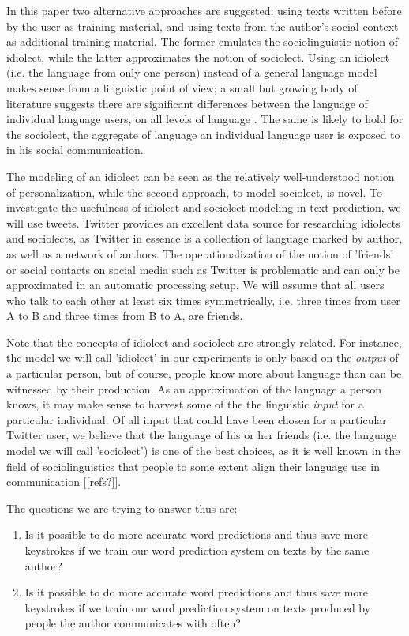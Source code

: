 \documentclass[11pt]{article}
\begin{document}
In this paper two alternative approaches are suggested: using texts written before by the user as training material, and using texts from the author's social context as additional training material. The former emulates the sociolinguistic notion of idiolect, while the latter approximates the notion of sociolect. Using an idiolect (i.e. the language from only one person) instead of a general language model makes sense from a linguistic point of view; a small but growing body of literature suggests there are significant differences between the language of individual language users, on all levels of language \cite[among others]{mollin09,barlow10}. The same is likely to hold for the sociolect, the aggregate of language an individual language user is exposed to in his social communication.

The modeling of an idiolect can be seen as the relatively well-understood notion of personalization, while the second approach, to model sociolect, is novel. To investigate the usefulness of idiolect and sociolect modeling in text prediction, we will use tweets. Twitter provides an excellent data source for researching idiolects and sociolects, as Twitter in essence is a collection of language marked by author, as well as a network of authors. The operationalization of the notion of 'friends' or social contacts on social media such as Twitter is problematic and can only be approximated in an automatic processing setup. We will assume that all users who talk to each other at least six times symmetrically, i.e. three times from user A to B and three times from B to A, are friends. 

Note that the concepts of idiolect and sociolect are strongly related. For instance, the model we will call 'idiolect' in our experiments is only based on the \emph{output} of a particular person, but of course, people know more about language than can be witnessed by their production. As an approximation of the language a person knows, it may make sense to harvest some of the the linguistic \emph{input} for a particular individual. Of all input that could have been chosen for a particular Twitter user, we believe that the language of his or her friends (i.e. the language model we will call 'sociolect') is one of the best choices, as it is well known in the field of sociolinguistics that people to some extent align their language use in communication [[refs?]]. 

The questions we are trying to answer thus are:

\begin{enumerate}
\item Is it possible to do more accurate word predictions and thus save more keystrokes if we train our word prediction system on texts by the same author?
\item Is it possible to do more accurate word predictions and thus save more keystrokes if we train our word prediction system on texts produced by people the author communicates with often?
\end{enumerate}
\end{document}
